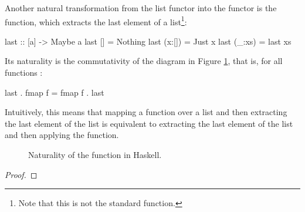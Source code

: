 \begin{example}
  \label{ex:natural-last-haskell}

  Another natural transformation from the list functor into the
   functor is the  function,
  which extracts the last element of a list\footnote{Note that this is
    not the standard  function.}:
  \begin{codehaskell}
last :: [a] -> Maybe a
last []     = Nothing
last (x:[]) = Just x
last (_:xs) = last xs
  \end{codehaskell}
  Its naturality is the commutativity of the diagram in Figure
  \ref{fig:naturality-last-haskell}, that is, for all functions
  :
  \begin{codehaskell}
last . fmap f = fmap f . last
  \end{codehaskell}
  Intuitively, this means that mapping a function over a list and then
  extracting the last element of the list is equivalent to extracting
  the last element of the list and then applying the function.

  \begin{figure}[htb]
    \begin{center}
    \end{center}
    \caption{Naturality of the  function in Haskell.}
    \label{fig:naturality-last-haskell}
  \end{figure}

  \begin{proof}


\end{proof}
\end{example}
